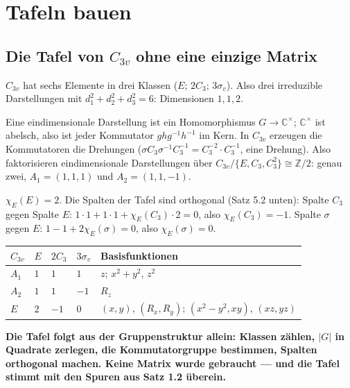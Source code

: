 \chapter{Tafeln bauen}

\section{Die Tafel von $C_{3v}$ ohne eine einzige Matrix}

\begin{merksatz}
$C_{3v}$ hat sechs Elemente in drei Klassen ($E$; $2C_3$; $3\sigma_v$). Also drei irreduzible Darstellungen mit $d_1^{2} + d_2^{2} + d_3^{2} = 6$: Dimensionen $1, 1, 2$.

Eine eindimensionale Darstellung ist ein Homomorphismus $G\to\mathbb C^{\times}$; $\mathbb C^{\times}$ ist abelsch, also ist jeder Kommutator $ghg^{-1}h^{-1}$ im Kern. In $C_{3v}$ erzeugen die Kommutatoren die Drehungen ($\sigma C_3\sigma^{-1}C_3^{-1} = C_3^{-2}\cdot C_3^{-1}$, eine Drehung). Also faktorisieren eindimensionale Darstellungen über $C_{3v}/\{E, C_3, C_3^{2}\}\cong\mathbb Z/2$: genau zwei, $A_1 = (1, 1, 1)$ und $A_2 = (1, 1, -1)$.

$\chi_E(E) = 2$. Die Spalten der Tafel sind orthogonal (Satz 5.2 unten): Spalte $C_3$ gegen Spalte $E$: $1\cdot1 + 1\cdot1 + \chi_E(C_3)\cdot2 = 0$, also $\chi_E(C_3) = -1$. Spalte $\sigma$ gegen $E$: $1 - 1 + 2\chi_E(\sigma) = 0$, also $\chi_E(\sigma) = 0$.

\begin{center}
{\small
\renewcommand{\arraystretch}{1.46}
\begin{tabular}{@{}P{1.2cm}P{0.8cm}P{1.0cm}P{1.0cm}P{3.6cm}@{}}
\toprule
$C_{3v}$ & $E$ & $2C_3$ & $3\sigma_v$ & \textbf{Basisfunktionen}\\
\midrule
$A_1$ & $1$ & $1$ & $1$ & $z$; $x^{2} + y^{2}$, $z^{2}$\\
$A_2$ & $1$ & $1$ & $-1$ & $R_z$\\
$E$ & $2$ & $-1$ & $0$ & $(x, y)$, $(R_x, R_y)$; $(x^{2} - y^{2}, xy)$, $(xz, yz)$\\
\bottomrule
\end{tabular}}
\end{center}

\begin{center}
\begin{minipage}{0.9\textwidth}
\textbf{Die Tafel folgt aus der Gruppenstruktur allein: Klassen zählen, $|G|$ in Quadrate zerlegen, die Kommutatorgruppe bestimmen, Spalten orthogonal machen. Keine Matrix wurde gebraucht --- und die Tafel stimmt mit den Spuren aus Satz 1.2 überein.}
\end{minipage}
\end{center}


\end{merksatz}
